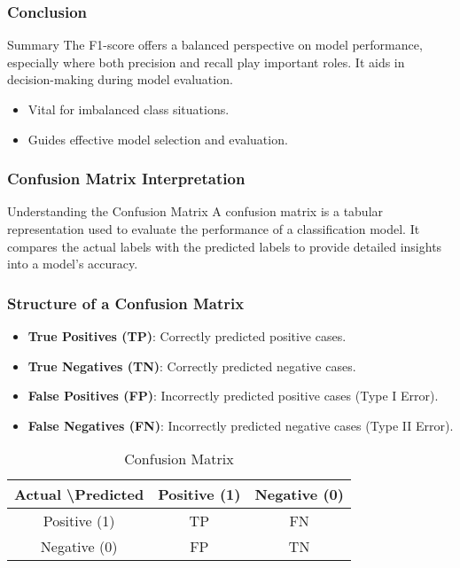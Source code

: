 \documentclass[aspectratio=169]{beamer}
\begin{document}
\begin{frame}[fragile]
    \frametitle{Conclusion}

    \begin{block}{Summary}
        The F1-score offers a balanced perspective on model performance, especially where both precision and recall play important roles. It aids in decision-making during model evaluation.
    \end{block}
    
    \begin{itemize}
        \item Vital for imbalanced class situations.
        \item Guides effective model selection and evaluation.
    \end{itemize}
\end{frame}

\begin{frame}[fragile]
    \frametitle{Confusion Matrix Interpretation}
    \begin{block}{Understanding the Confusion Matrix}
        A confusion matrix is a tabular representation used to evaluate the performance of a classification model. It compares the actual labels with the predicted labels to provide detailed insights into a model's accuracy. 
    \end{block}
\end{frame}

\begin{frame}[fragile]
    \frametitle{Structure of a Confusion Matrix}
    \begin{itemize}
        \item \textbf{True Positives (TP)}: Correctly predicted positive cases.
        \item \textbf{True Negatives (TN)}: Correctly predicted negative cases.
        \item \textbf{False Positives (FP)}: Incorrectly predicted positive cases (Type I Error).
        \item \textbf{False Negatives (FN)}: Incorrectly predicted negative cases (Type II Error).
    \end{itemize}
    
    \begin{table}[ht]
        \centering
        \begin{tabular}{|c|c|c|}
            \hline
            Actual \textbackslash Predicted & Positive (1) & Negative (0) \\
            \hline
            Positive (1) & TP & FN \\
            \hline
            Negative (0) & FP & TN \\
            \hline
        \end{tabular}
        \caption{Confusion Matrix}
    \end{table}
\end{frame}
\end{document}
